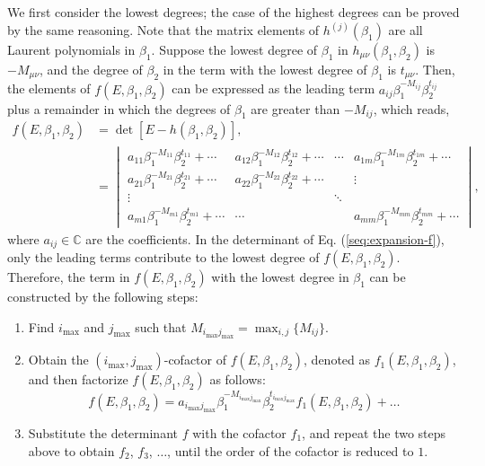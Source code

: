 We first consider the lowest degrees; the case of the highest degrees
can be proved by the same reasoning. Note that the matrix elements
of $h^{(j)}(\beta_{1})$ are all Laurent polynomials in $\beta_{1}$.
Suppose the lowest degree of $\beta_{1}$ in $h_{\mu\nu}(\beta_{1},\beta_{2})$
is $-M_{\mu\nu}$, and the degree of $\beta_{2}$ in the term with
the lowest degree of $\beta_{1}$ is $t_{\mu\nu}$. Then, the elements
of $f(E,\beta_{1},\beta_{2})$ can be expressed as the leading term
$a_{ij}\beta_{1}^{-M_{ij}}\beta_{2}^{t_{ij}}$ plus a remainder in
which the degrees of $\beta_{1}$ are greater than $-M_{ij}$, which
reads, 
\begin{align}
f\left(E,\beta_{1},\beta_{2}\right) & =\det\left[E-h\left(\beta_{1},\beta_{2}\right)\right],\nonumber \\
 & =\begin{vmatrix}a_{11}\beta_{1}^{-M_{11}}\beta_{2}^{t_{11}}+\cdots & a_{12}\beta_{1}^{-M_{12}}\beta_{2}^{t_{12}}+\cdots & \cdots & a_{1m}\beta_{1}^{-M_{1m}}\beta_{2}^{t_{1m}}+\cdots\\
a_{21}\beta_{1}^{-M_{21}}\beta_{2}^{t_{21}}+\cdots & a_{22}\beta_{1}^{-M_{22}}\beta_{2}^{t_{22}}+\cdots &  & \vdots\\
\vdots &  & \ddots\\
a_{m1}\beta_{1}^{-M_{m1}}\beta_{2}^{t_{m1}}+\cdots & \cdots &  & a_{mm}\beta_{1}^{-M_{mm}}\beta_{2}^{t_{mm}}+\cdots
\end{vmatrix},\label{seq:expansion-f}
\end{align}
where $a_{ij}\in\mathbb{C}$ are the coefficients. In the determinant
of Eq. (\ref{seq:expansion-f}), only the leading terms contribute
to the lowest degree of $f(E,\beta_{1},\beta_{2})$. Therefore, the
term in $f(E,\beta_{1},\beta_{2})$ with the lowest degree in $\beta_{1}$
can be constructed by the following steps: 
\begin{enumerate}
\item Find $i_{\max}$ and $j_{\max}$ such that $M_{i_{\max}j_{\max}}=\max_{i,j}\{M_{ij}\}$. 
\item Obtain the $(i_{\max},j_{\max})$-cofactor of $f(E,\beta_{1},\beta_{2})$,
denoted as $f_{1}(E,\beta_{1},\beta_{2})$, and then factorize $f(E,\beta_{1},\beta_{2})$
as follows: 
\begin{equation}
f\left(E,\beta_{1},\beta_{2}\right)=a_{i_{\max}j_{\max}}\beta_{1}^{-M_{i_{\max}j_{\max}}}\beta_{2}^{t_{i_{\max}j_{\max}}}f_{1}\left(E,\beta_{1},\beta_{2}\right)+\dots
\end{equation}
\item Substitute the determinant $f$ with the cofactor $f_{1}$, and repeat
the two steps above to obtain $f_{2}$, $f_{3}$, $\dots$, until
the order of the cofactor is reduced to $1$. 
\end{enumerate}

